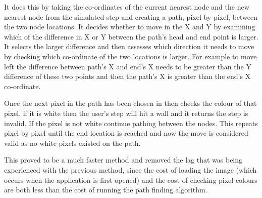 \documentclass[main.tex]{subfiles}
\begin{document}
It does this by taking the co-ordinates of the current nearest node and the new nearest node from the simulated step and creating a path, pixel by pixel, between the two node locations. It decides whether to move in the X and Y by examining which of the difference in X or Y between the path's head and end point is larger. It selects the larger difference and then assesses which direction it needs to move by checking which co-ordinate of the two locations is larger. For example to move left the difference between path's X and end's X needs to be greater than the Y difference of these two points and then the path's X is greater than the end's X co-ordinate.

Once the next pixel in the path has been chosen in then checks the colour of that pixel, if it is white then the user's step will hit a wall and it returns the step is invalid. If the pixel is not white continue pathing between the nodes. This repeats pixel by pixel until the end location is reached and now the move is considered valid as no white pixels existed on the path.

This proved to be a much faster method and removed the lag that was being experienced with the previous method, since the cost of loading the image (which occurs when the application is first opened) and the cost of checking pixel colours are both less than the cost of running the path finding algorithm.
\end{document}
